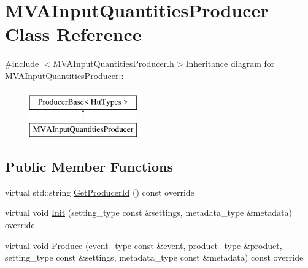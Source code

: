 \hypertarget{classMVAInputQuantitiesProducer}{
\section{MVAInputQuantitiesProducer Class Reference}
\label{classMVAInputQuantitiesProducer}
}


{\ttfamily \#include $<$MVAInputQuantitiesProducer.h$>$}Inheritance diagram for MVAInputQuantitiesProducer::\begin{figure}[H]
\begin{center}
\leavevmode
\includegraphics[height=2cm]{classMVAInputQuantitiesProducer}
\end{center}
\end{figure}
\subsection*{Public Member Functions}
\begin{DoxyCompactItemize}
\item 
virtual std::string \hyperlink{classMVAInputQuantitiesProducer_ade0e1156bab3ebe0cc16791872c5220a}{GetProducerId} () const override
\item 
virtual void \hyperlink{classMVAInputQuantitiesProducer_a97888cc193c53efbcd27d07a23ac60da}{Init} (setting\_\-type const \&settings, metadata\_\-type \&metadata) override
\item 
virtual void \hyperlink{classMVAInputQuantitiesProducer_a58ea5b944538535fe441350813219945}{Produce} (event\_\-type const \&event, product\_\-type \&product, setting\_\-type const \&settings, metadata\_\-type const \&metadata) const override
\end{DoxyCompactItemize}


